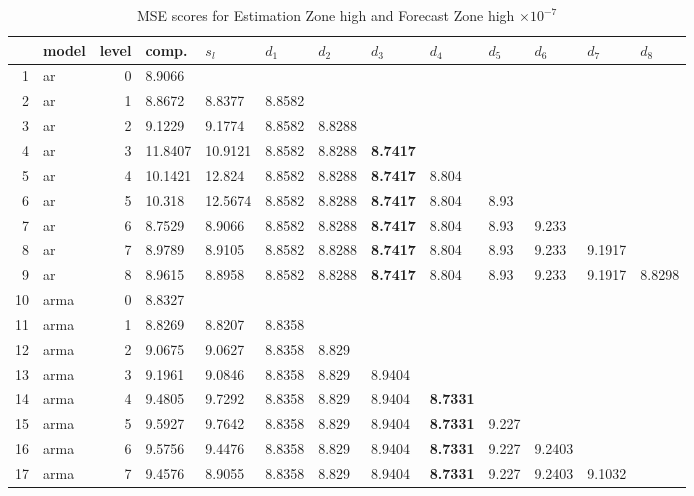 \documentclass[10pt,a4paper]{article}
\begin{document}
\begin{table}[ht]
\centering
\caption{MSE scores for Estimation Zone high and Forecast Zone high $ \times 10^{-7}$} 
\begin{tabular}{rlrllllllllll}
  \hline
 & model & level & comp. & $s_l$ & $d_1$ & $d_2$ & $d_3$ & $d_4$ & $d_5$ & $d_6$ & $d_7$ & $d_8$ \\ 
  \hline
1 & ar &     0 & 8.9066 &  &  &  &  &  &  &  &  &  \\ 
  2 & ar &     1 & 8.8672 & 8.8377 & 8.8582 &  &  &  &  &  &  &  \\ 
  3 & ar &     2 & 9.1229 & 9.1774 & 8.8582 & 8.8288 &  &  &  &  &  &  \\ 
  4 & ar &     3 & 11.8407 & 10.9121 & 8.8582 & 8.8288 & \textbf{8.7417} &  &  &  &  &  \\ 
  5 & ar &     4 & 10.1421 & 12.824 & 8.8582 & 8.8288 & \textbf{8.7417} & 8.804 &  &  &  &  \\ 
  6 & ar &     5 & 10.318 & 12.5674 & 8.8582 & 8.8288 & \textbf{8.7417} & 8.804 & 8.93 &  &  &  \\ 
  7 & ar &     6 & 8.7529 & 8.9066 & 8.8582 & 8.8288 & \textbf{8.7417} & 8.804 & 8.93 & 9.233 &  &  \\ 
  8 & ar &     7 & 8.9789 & 8.9105 & 8.8582 & 8.8288 & \textbf{8.7417} & 8.804 & 8.93 & 9.233 & 9.1917 &  \\ 
  9 & ar &     8 & 8.9615 & 8.8958 & 8.8582 & 8.8288 & \textbf{8.7417} & 8.804 & 8.93 & 9.233 & 9.1917 & 8.8298 \\ 
   \hline
10 & arma &     0 & 8.8327 &  &  &  &  &  &  &  &  &  \\ 
  11 & arma &     1 & 8.8269 & 8.8207 & 8.8358 &  &  &  &  &  &  &  \\ 
  12 & arma &     2 & 9.0675 & 9.0627 & 8.8358 & 8.829 &  &  &  &  &  &  \\ 
  13 & arma &     3 & 9.1961 & 9.0846 & 8.8358 & 8.829 & 8.9404 &  &  &  &  &  \\ 
  14 & arma &     4 & 9.4805 & 9.7292 & 8.8358 & 8.829 & 8.9404 & \textbf{8.7331} &  &  &  &  \\ 
  15 & arma &     5 & 9.5927 & 9.7642 & 8.8358 & 8.829 & 8.9404 & \textbf{8.7331} & 9.227 &  &  &  \\ 
  16 & arma &     6 & 9.5756 & 9.4476 & 8.8358 & 8.829 & 8.9404 & \textbf{8.7331} & 9.227 & 9.2403 &  &  \\ 
  17 & arma &     7 & 9.4576 & 8.9055 & 8.8358 & 8.829 & 8.9404 & \textbf{8.7331} & 9.227 & 9.2403 & 9.1032 &  \\ 

\end{tabular}
\end{table}
\end{document}
